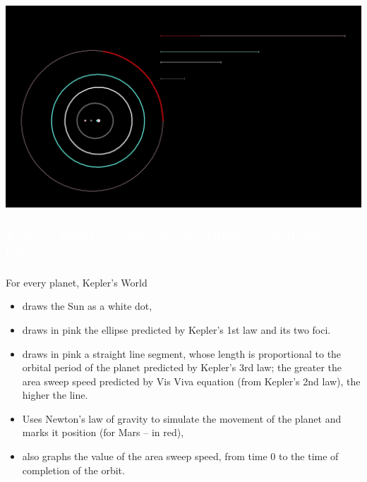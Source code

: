 \documentclass[aspectratio=169,xcolor=pdftex,dvipsnames]{beamer} %
\begin{document}


{
{
    \includegraphics[width=\paperwidth]{Screenshot2.jpg}
}
\begin{frame}
\frametitle{\textcolor{white}{Kepler's World -- a computer simulation to test Kepler's laws}}
 
\end{frame}
}


\begin{frame}
\frametitle{}

For every planet, Kepler's World
\begin{itemize}
\item 
draws the Sun as a white dot,
\item
draws in pink the ellipse predicted by Kepler's 1st law and its two foci.
\item
draws in pink a straight line segment, whose length is proportional to the orbital period of the planet predicted by Kepler's 3rd law; the greater the area sweep speed predicted by Vis Viva equation (from Kepler's 2nd law), the higher the line.
\item 
Uses Newton's law of gravity to simulate the movement of the planet and
marks it position (for Mars -- in red),
\item
also graphs the value of the area sweep speed, from time 0 to the time of completion of the orbit.
\end{itemize}

\end{frame}
\end{document}

